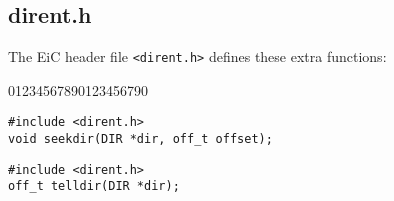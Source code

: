 \subsection{dirent.h}
\label{sec:direnthImplementation}

The EiC header file \verb+<dirent.h>+ defines these extra functions:

\begin{Ventry2}{01234567890123456790}

\item[seekdir]
\label{item:seekdir}
\begin{production}
\begin{verbatim}
#include <dirent.h>
void seekdir(DIR *dir, off_t offset);
\end{verbatim}
\end{production}

\item[telldir]
\label{item:telldir}
\begin{production}
\begin{verbatim}
#include <dirent.h>
off_t telldir(DIR *dir);
\end{verbatim}
\end{production}

\end{Ventry2}













